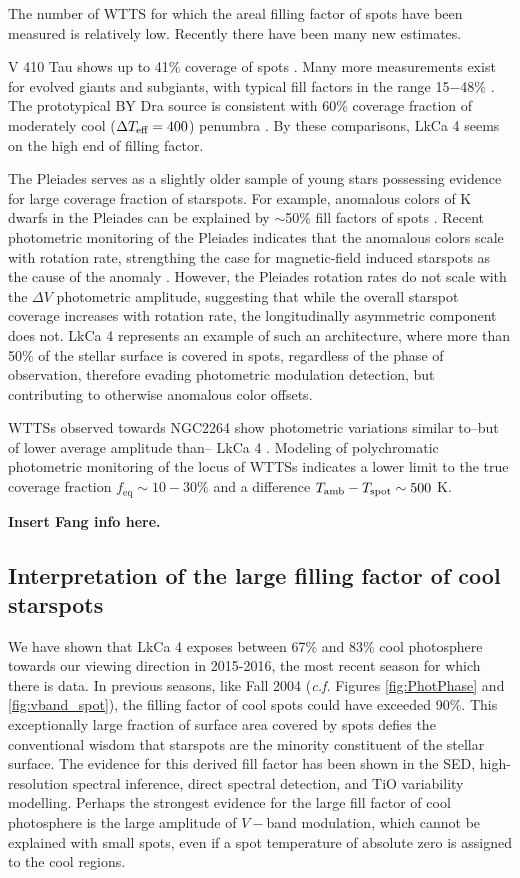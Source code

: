 \documentclass[twocolumn]{emulateapj}%
\begin{document}
The number of WTTS for which the areal filling factor of spots have been measured is relatively low.  Recently there have been many new estimates.

V 410 Tau shows up to 41\% coverage of spots \citep{petrov94}.  Many more measurements exist for evolved giants and subgiants, with typical fill factors in the range 15$-$48\% \citep{berdyugina05}.  The prototypical BY Dra source is consistent with 60\% coverage fraction of moderately cool ($\Delta T_\textrm{eff} =400$) penumbra \citep{chugainov76}.  By these comparisons, LkCa 4 seems on the high end of filling factor.

The Pleiades serves as a slightly older sample of young stars possessing evidence for large coverage fraction of starspots.  For example, anomalous colors of K dwarfs in the Pleiades can be explained by $\sim$50\% fill factors of spots \citep{stauffer03}.  Recent photometric monitoring of the Pleiades indicates that the anomalous colors scale with rotation rate, strengthing the case for magnetic-field induced starspots as the cause of the anomaly \citep{covey16}.  However, the \citet{covey16} Pleiades rotation rates do not scale with the $\Delta V$ photometric amplitude, suggesting that while the overall starspot coverage increases with rotation rate, the longitudinally asymmetric component does not.  LkCa 4 represents an example of such an architecture, where more than 50\% of the stellar surface is covered in spots, regardless of the phase of observation, therefore evading photometric modulation detection, but contributing to otherwise anomalous color offsets.

WTTSs observed towards NGC2264 show photometric variations similar to--but of lower average amplitude than-- LkCa 4 \citep{venuti15}.  Modeling of polychromatic photometric monitoring of the locus of WTTSs indicates a lower limit to the true coverage fraction $f_{\mathrm{eq}}\sim10-30\%$ and a difference $T_\textrm{amb}-T_\textrm{spot}\sim500$ K.

\textbf{Insert Fang info here.}



\subsection{Interpretation of the large filling factor of cool starspots}
We have shown that LkCa 4 exposes between 67\% and 83\% cool photosphere towards our viewing direction in 2015-2016, the most recent season for which there is data.  In previous seasons, like Fall 2004 (\emph{c.f.} Figures \ref{fig:PhotPhase} and \ref{fig:vband_spot}), the filling factor of cool spots could have exceeded 90\%.  This exceptionally large fraction of surface area covered by spots defies the conventional wisdom that starspots are the minority constituent of the stellar surface.  The evidence for this derived fill factor has been shown in the SED, high-resolution spectral inference, direct spectral detection, and TiO variability modelling.  Perhaps the strongest evidence for the large fill factor of cool photosphere is the large amplitude of $V-$band modulation, which cannot be explained with small spots, even if a spot temperature of absolute zero is assigned to the cool regions.
\end{document}
